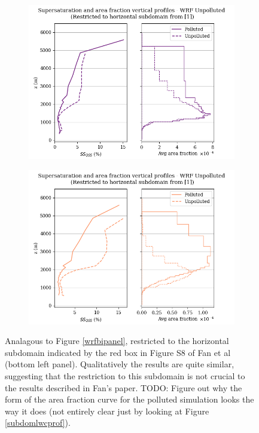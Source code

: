 \documentclass{article}
\begin{document}
\begin{figure}[ht]
	\centering
	\begin{subfigure}{0.7\textwidth}
		\includegraphics[width=\textwidth]{revmywrf/v3_FINAL_subdom_bipanel_ss_qss_vs_z_allpts_figure.png}
		\caption{}
		\label{wrfsubdombipanelallpts}
	\end{subfigure}
	\begin{subfigure}{0.7\textwidth}
		\includegraphics[width=\textwidth]{revmywrf/v3_FINAL_subdom_bipanel_ss_qss_vs_z_up10perc_figure.png}
		\caption{}
		\label{wrfsubdombipanelup50perc}
	\end{subfigure}
	\caption{Analagous to Figure \ref{wrfbipanel}, restricted to the horizontal subdomain indicated by the red box in Figure S8 of Fan et al (bottom left panel). Qualitatively the results are quite similar, suggesting that the restriction to this subdomain is not crucial to the results described in Fan's paper. TODO: Figure out why the form of the area fraction curve for the polluted simulation looks the way it does (not entirely clear just by looking at Figure \ref{subdomlwcprof}).}
	\label{wrfsubdombipanel}
\end{figure}
\end{document}
